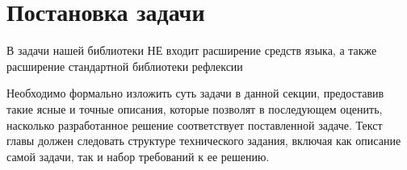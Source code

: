 \section{Постановка задачи}
\label{sec:Chapter1} 

В задачи нашей библиотеки НЕ входит расширение средств языка, а также расширение стандартной библиотеки рефлексии

Необходимо формально изложить суть задачи в данной секции, предоставив такие
ясные и точные описания, которые позволят в последующем оценить, насколько
разработанное решение соответствует поставленной задаче. Текст главы должен
следовать структуре технического задания, включая как описание самой задачи,
так и набор требований к ее решению.

\newpage
